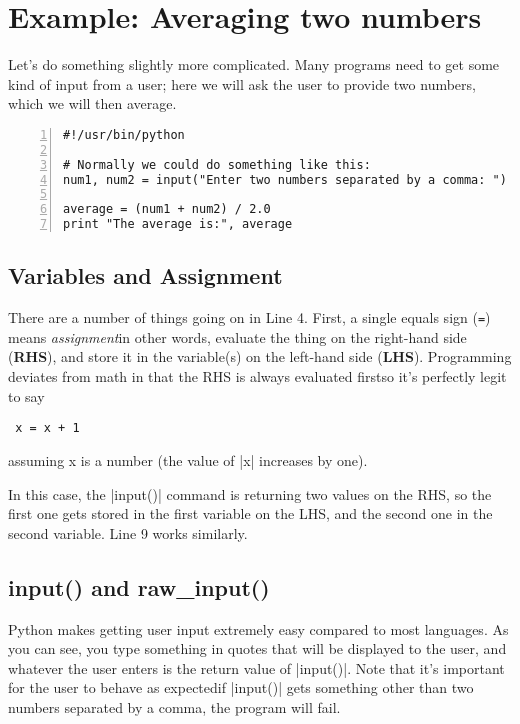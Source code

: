 \documentclass{article}
\begin{document}
\section{Example: Averaging two numbers}

Let's do something slightly more complicated.  Many programs need to get some
kind of input from a user; here we will ask the user to provide two numbers,
which we will then average.

\begin{Verbatim}[numbers=left]
#!/usr/bin/python

# Normally we could do something like this:
num1, num2 = input("Enter two numbers separated by a comma: ")

average = (num1 + num2) / 2.0
print "The average is:", average
\end{Verbatim}

\subsection{Variables and Assignment}
There are a number of things going on in Line 4.  First, a single equals sign
(\texttt{=}) means \textit{assignment}\textemdash in other words, evaluate the
thing on the right-hand side (\textbf{RHS}), and store it in the variable(s) on
the left-hand side (\textbf{LHS}).  Programming deviates from math in that the
RHS is always evaluated first\textemdash so it's perfectly legit to say

\begin{Verbatim}
 x = x + 1
\end{Verbatim}

 assuming x is a number (the value of |x| increases by one).

In this case, the |input()| command is returning two values on the RHS, so the
first one gets stored in the first variable on the LHS, and the second one in
the second variable.  Line 9 works similarly.

\subsection{input() and raw\_input()}
Python makes getting user input extremely easy compared to most languages.  As
you can see, you type something in quotes that will be displayed to the user,
and whatever the user enters is the return value of |input()|.  Note that it's
important for the user to behave as expected\textemdash if |input()| gets
something other than two numbers separated by a comma, the program will fail.
\end{document}

